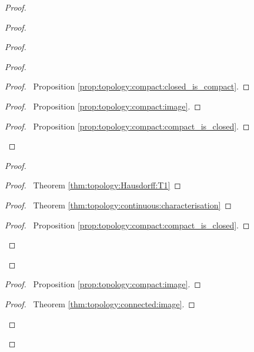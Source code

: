 \begin{proof}
  \pf
  \begin{proof}
  \begin{proof}
    \begin{proof}
      \begin{proof}
        \pf\ Proposition \ref{prop:topology:compact:closed_is_compact}.
      \end{proof}
      \begin{proof}
        \pf\ Proposition \ref{prop:topology:compact:image}.
      \end{proof}
      \begin{proof}
        \pf\ Proposition \ref{prop:topology:compact:compact_is_closed}.
      \end{proof}
    \end{proof}
    \begin{proof}
      \begin{proof}
        \pf\ Theorem \ref{thm:topology:Hausdorff:T1}
      \end{proof}
      \begin{proof}
        \pf\ Theorem \ref{thm:topology:continuous:characterisation}
      \end{proof}
      \begin{proof}
        \pf\ Proposition \ref{prop:topology:compact:compact_is_closed}.
      \end{proof}
    \end{proof}
  \end{proof}
  \begin{proof}
    \pf\ Proposition \ref{prop:topology:compact:image}.
  \end{proof}
  \begin{proof}
    \pf\ Theorem \ref{thm:topology:connected:image}.
  \end{proof}

\end{proof}
\end{proof}

